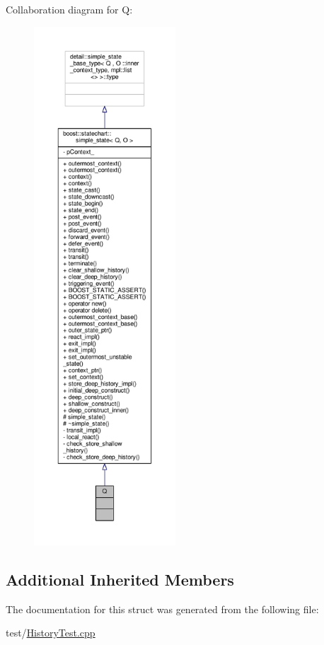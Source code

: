 Collaboration diagram for Q\+:
\nopagebreak
\begin{figure}[H]
\begin{center}
\leavevmode
\includegraphics[height=550pt]{struct_q__coll__graph}
\end{center}
\end{figure}
\subsection*{Additional Inherited Members}


The documentation for this struct was generated from the following file\+:\begin{DoxyCompactItemize}
\item 
test/\mbox{\hyperlink{_history_test_8cpp}{History\+Test.\+cpp}}\end{DoxyCompactItemize}
